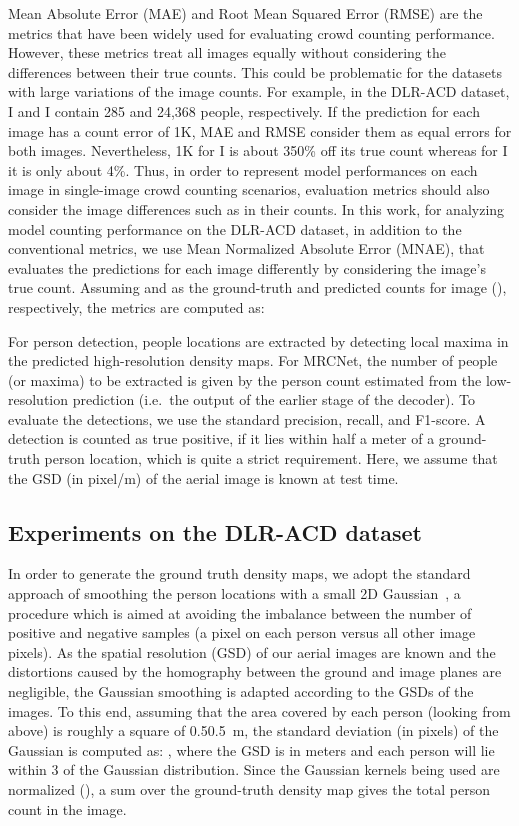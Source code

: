 \documentclass{bmvc2k}
\newcommand{\x}{}
\newcommand{\XNET}{MRCNet}
\begin{document}
Mean Absolute Error (MAE) and Root Mean Squared Error (RMSE) are the metrics that have been widely used for evaluating crowd counting performance.
However, these metrics treat all images equally without considering the differences between their true counts. This could be problematic for the datasets with large variations of the image counts. For example, in the DLR-ACD dataset, I and I contain 285 and 24,368 people, respectively. If the prediction for each image has a count error of 1K, MAE and RMSE consider them as equal errors for both images. Nevertheless, 1K for I is about 350\% off its true count whereas for I it is only about 4\%. Thus, in order to represent model performances on each image in single-image crowd counting scenarios, evaluation metrics should also consider the image differences such as in their counts. In this work, for analyzing model counting performance on the DLR-ACD dataset, in addition to the conventional metrics, we use Mean Normalized Absolute Error (MNAE), that evaluates the predictions for each image differently by considering the image's true count. Assuming  and  as the ground-truth and predicted counts for image  (), respectively, the metrics are computed as:


For person detection, people locations are extracted by detecting local maxima in the predicted high-resolution density maps. For \XNET, the number of people (or maxima) to be extracted is given by the person count estimated from the low-resolution prediction (i.e.\ the output of the earlier stage of the decoder). 
To evaluate the detections, we use the standard precision, recall, and F1-score. A detection is counted as true positive, if it lies within half a meter of a ground-truth person location, which is quite a strict requirement. Here, we assume that the GSD (in pixel/m) of the aerial image is known at test time. 

\subsection{Experiments on the DLR-ACD dataset}
In order to generate the ground truth density maps, we adopt the standard approach of smoothing the person locations with a small 2D Gaussian~\cite{Zhang2016}, a procedure which is aimed at avoiding the imbalance between the number of positive and negative samples (a pixel on each person versus all other image pixels). 
As the spatial resolution (GSD) of our aerial images are known and the distortions caused by the homography between the ground and image planes are negligible, the Gaussian smoothing is adapted according to the GSDs of the images. To this end, assuming that the area covered by each person (looking from above) is roughly a square of 0.5\x0.5~m, the standard deviation (in pixels) of the Gaussian is computed as: , where the GSD is in meters and each person will lie within 3 of the Gaussian distribution. Since the Gaussian kernels being used are normalized (), a sum over the ground-truth density map gives the total person count in the image.
\end{document}
